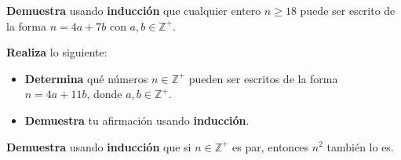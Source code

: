 \documentclass[oneside]{style}
\begin{document}
\begin{questions}[label=\protect\circled{\bfseries\arabic*}]
    \question
    {
        \textbf{Demuestra} usando \textbf{inducción} que cualquier entero 
        $n \geq 18$ puede ser escrito de la forma $n = 4a + 7b$ con $a,b \in 
        \mathbb{Z}^+$.
    }

    \question
    {
        \textbf{Realiza} lo siguiente:
        \begin{itemize}
            \item \textbf{Determina} qué números $n \in \mathbb{Z^+}$ pueden 
            ser escritos de la forma $n = 4a + 11b$, donde $a,b \in 
            \mathbb{Z}^+$.

            \item \textbf{Demuestra} tu afirmación usando \textbf{inducción}.
        \end{itemize}
    }

    \question
    {
        \textbf{Demuestra} usando \textbf{inducción} que si $n \in \mathbb{Z}^+$
        es par, entonces $n^2$ también lo es. 
    }

\end{questions}
\end{document}
